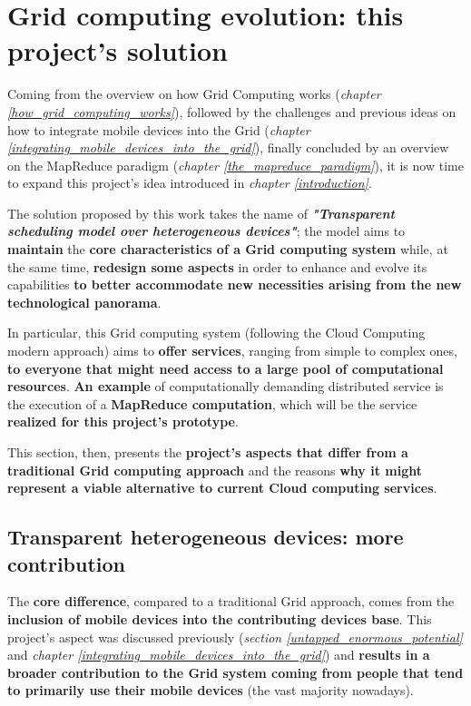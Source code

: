 \section{Grid computing evolution: this project's solution}
Coming from the overview on how Grid Computing works (\textit{chapter \ref{how_grid_computing_works}}), followed by the challenges and previous ideas on how to integrate mobile devices into the Grid (\textit{chapter \ref{integrating_mobile_devices_into_the_grid}}), finally concluded by an overview on the MapReduce paradigm (\textit{chapter \ref{the_mapreduce_paradigm}}), it is now time to expand this project's idea introduced in \textit{chapter \ref{introduction}}.

The solution proposed by this work takes the name of \textbf{\textit{"Transparent scheduling model over heterogeneous devices"}}; the model aims to \textbf{maintain} the \textbf{core characteristics of a Grid computing system} while, at the same time, \textbf{redesign some aspects} in order to enhance and evolve its capabilities \textbf{to better accommodate new necessities arising from the new technological panorama}.

In particular, this Grid computing system (following the Cloud Computing modern approach) aims to \textbf{offer services}, ranging from simple to complex ones, \textbf{to everyone that might need access to a large pool of computational resources}. \textbf{An example} of computationally demanding distributed service is the execution of a \textbf{MapReduce computation}, which will be the service \textbf{realized for this project's prototype}.

This section, then, presents the \textbf{project's aspects that differ from a traditional Grid computing approach} and the reasons \textbf{why it might represent a viable alternative to current Cloud computing services}.

\subsection{Transparent heterogeneous devices: more contribution}\label{transparent_heterogeneous_devices_more_contribution}
The \textbf{core difference}, compared to a traditional Grid approach, comes from the \textbf{inclusion of mobile devices into the contributing devices base}.
This project's aspect was discussed previously (\textit{section \ref{untapped_enormous_potential}} and \textit{chapter \ref{integrating_mobile_devices_into_the_grid}}) and \textbf{results in a broader contribution to the Grid system coming from people that tend to primarily use their mobile devices} (the vast majority nowadays).

